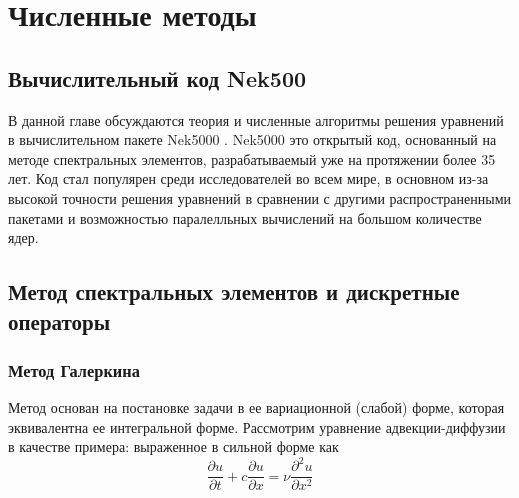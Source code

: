 \chapter{Численные методы}\label{ch:methods}

\section{Вычислительный код Nek500}\label{sec:ch1/nek5000}

В данной главе обсуждаются теория и численные алгоритмы решения уравнений в 
вычислительном пакете Nek5000 \cite{nek}. 
%
Nek5000 это открытый код, основанный на методе спектральных элементов, разрабатываемый
уже на протяжении более 35 лет.
%
Код стал популярен среди исследователей во всем мире, в основном из-за высокой точности решения уравнений 
в сравнении с другими распространенными пакетами и возможностью паралелльных вычислений 
на большом количестве ядер.
%
\section{Метод спектральных элементов и дискретные операторы}

%
\subsection{Метод Галеркина}
%
Метод основан на постановке задачи в ее вариационной (слабой) форме, которая
эквивалентна ее интегральной форме.
%
Рассмотрим уравнение адвекции-диффузии в качестве примера: выраженное в сильной форме как
%
\begin{equation}
    \frac{\partial u}{\partial t} + c \frac{\partial u}{\partial x} = 
    \nu \frac{\partial^2 u}{\partial x^2}
\end{equation}
%


